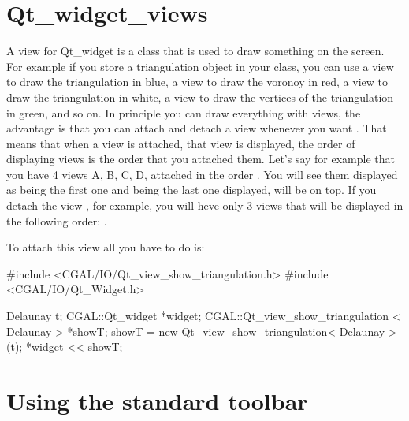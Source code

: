\section{Qt\_widget\_views}
\label{Qt_widget_views}

A view for Qt\_widget is a class that is used to draw something on the screen. 
For example if you store a triangulation object in your class, you can use a 
view to draw the triangulation in blue, a view to draw the voronoy in red, a 
view to draw the triangulation in white, a view to draw the vertices of the 
triangulation in green, and so on. In principle you can draw everything with
views, the advantage is that you can attach and detach a view whenever you want
. That means that when a view is attached, that view is displayed, the order of
displaying views is the order that you attached them. Let's say for example 
that you have 4 views A, B, C, D, attached in the order . You 
will see them displayed as  being the first one and  
being the last one displayed,  will be on top. If you detach the 
view , for example, you will heve only 3 views that will be 
displayed in the following order: .

To attach this view all you have to do is:
\begin{ccExampleCode}
#include <CGAL/IO/Qt_view_show_triangulation.h>
#include <CGAL/IO/Qt_Widget.h>

Delaunay t;
CGAL::Qt_widget  *widget;
CGAL::Qt_view_show_triangulation < Delaunay >  *showT;
showT   = new Qt_view_show_triangulation< Delaunay >(t);
*widget << showT;

\end{ccExampleCode}


\section{Using the standard toolbar}
\label{Qt_widget_standard_toolbar}

